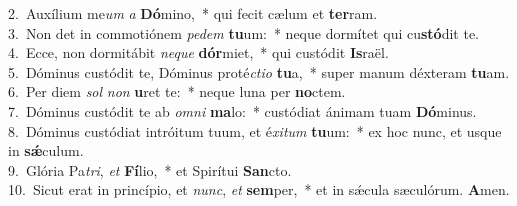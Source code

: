 {2.~}Auxílium me\textit{um} \textit{a} \textbf{Dó}mino,~* qui fecit cælum et \textbf{ter}ram.\\
{3.~}Non det in commotiónem \textit{pe}\textit{dem} \textbf{tu}um:~* neque dormítet qui cu\textbf{stó}dit te.\\
{4.~}Ecce, non dormitábit \textit{ne}\textit{que} \textbf{dór}miet,~* qui custódit \textbf{Is}raël.\\
{5.~}Dóminus custódit te, Dóminus proté\textit{cti}\textit{o} \textbf{tu}a,~* super manum déxteram \textbf{tu}am.\\
{6.~}Per diem \textit{sol} \textit{non} \textbf{u}ret te:~* neque luna per \textbf{no}ctem.\\
{7.~}Dóminus custódit te ab \textit{om}\textit{ni} \textbf{ma}lo:~* custódiat ánimam tuam \textbf{Dó}minus.\\
{8.~}Dóminus custódiat intróitum tuum, et é\textit{xi}\textit{tum} \textbf{tu}um:~* ex hoc nunc, et usque in \textbf{sǽ}culum.\\
{9.~}Glória Pa\textit{tri}, \textit{et} \textbf{Fí}lio,~* et Spirítui \textbf{San}cto.\\
{10.~}Sicut erat in princípio, et \textit{nunc}, \textit{et} \textbf{sem}per,~* et in sǽcula sæculórum. \textbf{A}men.\\
